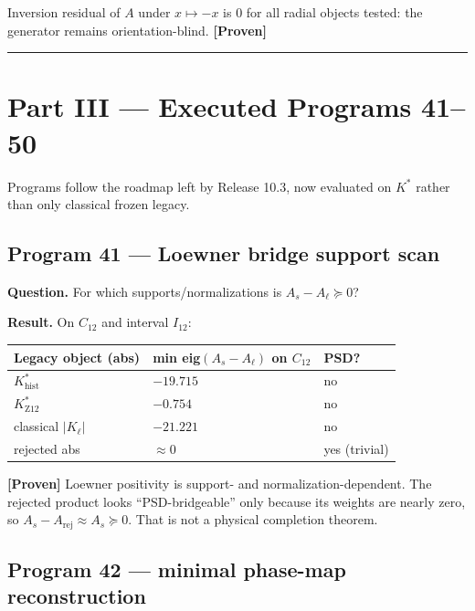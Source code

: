 \documentclass[11pt,a4paper,openany]{report}
\newcommand{\statusProven}{\textcolor{fingreen}{[Proven]}}
\begin{document}
Inversion residual of \(A\) under \(x\mapsto -x\) is \(0\) for all radial objects tested: the generator remains orientation-blind. \textbf{\statusProven{}}

\par\medskip\hrule\medskip

\chapter{Part III — Executed Programs 41–50}

Programs follow the roadmap left by Release 10.3, now evaluated on \(K^*\) rather than only classical frozen legacy.

\section{Program 41 — Loewner bridge support scan}

\textbf{Question.} For which supports/\allowbreak{}normalizations is \(A_s-A_\ell\succeq 0\)?

\textbf{Result.} On \(C_{12}\) and interval \(I_{12}\):

\begin{center}
\begingroup\small
\setlength{\tabcolsep}{3.5pt}
\renewcommand{\arraystretch}{1.16}
\begin{longtable}{@{}p{}p{}p{}@{}}
\toprule
\textbf{Legacy object (abs)} & \textbf{min eig\((A_s-A_\ell)\) on \(C_{12}\)} & \textbf{PSD?} \\
\midrule
\endhead
\(K^*_{\mathrm{hist}}\) & \(-19.715\) & no \\
\(K^*_{\mathrm{Z12}}\) & \(-0.754\) & no \\
classical \(|K_\ell|\) & \(-21.221\) & no \\
rejected abs & \(\approx 0\) & yes (trivial) \\
\bottomrule
\end{longtable}
\endgroup
\end{center}

\textbf{\statusProven{}} Loewner positivity is support- and normalization-dependent. The rejected product looks “PSD-bridgeable” only because its weights are nearly zero, so \(A_s-A_{\mathrm{rej}}\approx A_s\succeq 0\). That is not a physical completion theorem.

\section{Program 42 — minimal phase-map reconstruction}
\end{document}
